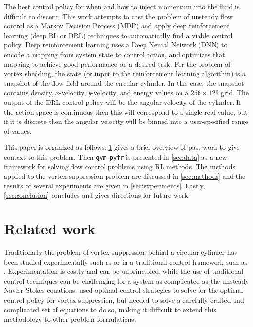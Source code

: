\documentclass{article}
\begin{document}
The best control policy for when and how to inject momentum into the fluid is difficult to discern. This work attempts to cast the problem of unsteady flow control as a Markov Decision Process (MDP) and apply deep reinforcement learning (deep RL or DRL) techniques to automatically find a viable control policy. Deep reinforcement learning uses a Deep Neural Network (DNN) to encode a mapping from system state to control action, and optimizes that mapping to achieve good performance on a desired task. For the problem of vortex shedding, the state (or input to the reinforcement learning algorithm) is a snapshot of the flow-field around the circular cylinder. In this case, the snapshot contains density, $x$-velocity, $y$-velocity, and energy values on a $256 \times 128$ grid. The output of the DRL control policy will be the angular velocity of the cylinder. If the action space is continuous then this will correspond to a single real value, but if it is discrete then the angular velocity will be binned into a user-specified range of values.

This paper is organized as follows: \cref{sec:related} gives a brief overview of past work to give context to this problem. Then \verb|gym-pyfr| is presented in \cref{sec:data} as a new framework for solving flow control problems using RL methods. The methods applied to the vortex suppression problem are discussed in \cref{sec:methods} and the results of several experiments are given in \cref{sec:experiments}. Lastly, \cref{sec:conclusion} concludes and gives directions for future work.


\section{Related work}
\label{sec:related}
Traditionally the problem of vortex suppression behind a circular cylinder has been studied experimentally such as \cite{bearman2004experimental} or in a traditional control framework such as \cite{homescu2002suppression}. Experimentation is costly and can be unprincipled, while the use of traditional control techniques can be challenging for a system as complicated as the unsteady Navier-Stokes equations. \cite{homescu2002suppression} used optimal control strategies to solve for the optimal control policy for vortex suppression, but needed to solve a carefully crafted and complicated set of equations to do so, making it difficult to extend this methodology to other problem formulations.
\end{document}
